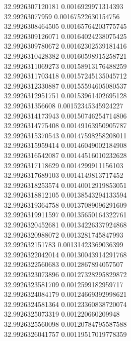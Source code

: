 {32.9926307120181	0.0016929971314393\\
32.99263077959	0.00167522630154756\\
32.9926308464505	0.00165764203775745\\
32.9926309126071	0.00164024238075425\\
32.9926309780672	0.00162302539181416\\
32.9926310428382	0.00160598915258721\\
32.9926311069273	0.00158913176488259\\
32.9926311703418	0.00157245135045712\\
32.9926312330887	0.00155594605080537\\
32.9926312951751	0.00153961402695128\\
32.992631356608	0.00152345345924227\\
32.9926314173943	0.00150746254714806\\
32.9926314775408	0.00149163950905787\\
32.9926315370543	0.00147598258208011\\
32.9926315959414	0.00146049002184908\\
32.9926316542087	0.00144516010232628\\
32.9926317118629	0.0014299911156103\\
32.9926317689103	0.0014149813717452\\
32.9926318253574	0.00140012919853051\\
32.9926318812105	0.00138543294133594\\
32.9926319364758	0.00137089096291609\\
32.9926319911597	0.00135650164322761\\
32.9926320452681	0.00134226337924868\\
32.9926320988072	0.0013281745847993\\
32.992632151783	0.00131423369036399\\
32.9926322042014	0.00130043914291768\\
32.9926322560683	0.0012867894057507\\
32.9926323073896	0.00127328295829872\\
32.9926323581709	0.0012599182959717\\
32.9926324084179	0.00124669392998621\\
32.9926324581364	0.00123360838720074\\
32.9926325073319	0.001220660209948\\
32.9926325560098	0.00120784795587588\\
32.9926326041757	0.00119517019778359\\
}
